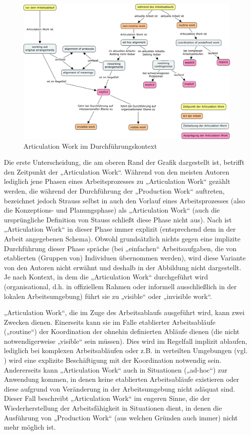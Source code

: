 \begin{figure}[htbp]
	\centering
		\includegraphics[width=15cm]{img/ArticulationWork/aw_conceptual_structure.png}
	\caption{Articulation Work im Durchführungskontext}
	\label{fig:img_ArticulationWork_aw_conceptual_structure}
\end{figure}

Die erste Unterscheidung, die am oberen Rand der Grafik dargestellt ist, betrifft den Zeitpunkt der „Articulation Work“. Während von den meisten Autoren lediglich jene Phasen eines Arbeitsprozesses zu „Articulation Work“ gezählt werden, die während der Durchführung der „Production Work“ auftreten, bezeichnet jedoch Strauss selbst in \citep{Corbin93} auch den Vorlauf eines Arbeitsprozesses (also die Konzeptions- und Planungsphase) als „Articulation Work“ (auch die ursprüngliche Definition von Stauss schließt diese Phase nicht aus). Nach  \citet{Corbin93} ist „Articulation Work“ in dieser Phase immer explizit (entsprechend dem in der Arbeit angegebenen Schema). Obwohl grundsätzlich nichts gegen eine implizite Durchführung dieser Phase spräche (bei „einfachen“ Arbeitsaufgaben, die von etablierten (Gruppen von) Individuen übernommen werden), wird diese Variante von den Autoren nicht erwähnt und deshalb in der Abbildung nicht dargestellt. Je nach Kontext, in dem die „Articulation Work“ durchgeführt wird (organisational, d.h. in offiziellem Rahmen oder informell ausschließlich in der lokalen Arbeitsumgebung) führt sie zu „visible“ oder „invisible work“.

„Articulation Work“, die im Zuge des Arbeitsablaufs ausgeführt wird, kann zwei Zwecken dienen. Einerseits kann sie im Falle etablierter Arbeitsabläufe („routine“) der Koordination der ohnehin definierten Abläufe dienen (die nicht notwendigerweise „visible“ sein müssen). Dies wird im Regelfall implizit ablaufen, lediglich bei komplexen Arbeitsabläufen oder z.B. in verteilten Umgebungen (vgl. \citep{Carstensen99}) wird eine explizite Beschäftigung mit der Koordination notwendig sein. Andererseits kann „Articulation Work“ auch in Situationen („ad-hoc“) zur Anwendung kommen, in denen keine etablierten Arbeitsabläufe existieren oder diese aufgrund von Veränderung in der Arbeitsumgebung nicht adäquat sind. Dieser Fall beschreibt „Articulation Work“ im engeren Sinne, die der Wiederherstellung der Arbeitsfähigkeit in Situationen dient, in denen die Ausführung von „Production Work“ (aus welchen Gründen auch immer) nicht mehr möglich ist.

